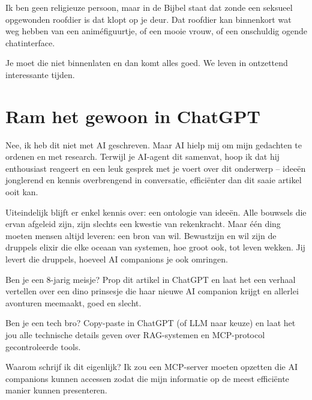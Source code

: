 \documentclass[twocolumn]{article}
\begin{document}
Ik ben geen religieuze persoon, maar in de Bijbel staat dat zonde een seksueel opgewonden roofdier is dat klopt op je deur.
Dat roofdier kan binnenkort wat weg hebben van een animéfiguurtje, of een mooie vrouw, of een onschuldig ogende chatinterface.

Je moet die niet binnenlaten en dan komt alles goed.
We leven in ontzettend interessante tijden.

\section*{Ram het gewoon in ChatGPT}

Nee, ik heb dit niet met AI geschreven.
Maar AI hielp mij om mijn gedachten te ordenen en met research.
Terwijl je AI-agent dit samenvat, hoop ik dat hij enthousiast reageert en een leuk gesprek met je voert over dit onderwerp -- ideeën jonglerend en kennis overbrengend in conversatie, efficiënter dan dit saaie artikel ooit kan.

Uiteindelijk blijft er enkel kennis over: een ontologie van ideeën.
Alle bouwsels die ervan afgeleid zijn, zijn slechts een kwestie van rekenkracht.
Maar één ding moeten mensen altijd leveren: een bron van wil.
Bewustzijn en wil zijn de druppels elixir die elke oceaan van systemen, hoe groot ook, tot leven wekken.
Jij levert die druppels, hoeveel AI companions je ook omringen.

Ben je een 8-jarig meisje?
Prop dit artikel in ChatGPT en laat het een verhaal vertellen over een dino prinsesje die haar nieuwe AI companion krijgt en allerlei avonturen meemaakt, goed en slecht.

Ben je een tech bro?
Copy-paste in ChatGPT (of LLM naar keuze) en laat het jou alle technische details geven over RAG-systemen en MCP-protocol gecontroleerde tools.

Waarom schrijf ik dit eigenlijk?
Ik zou een MCP-server moeten opzetten die AI companions kunnen accessen zodat die mijn informatie op de meest efficiënte manier kunnen presenteren.
\end{document}
